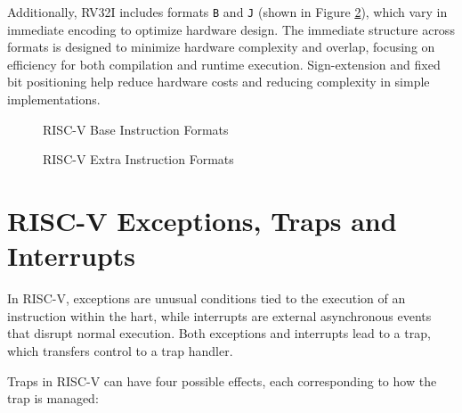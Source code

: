 Additionally, RV32I includes formats \texttt{B} and \texttt{J} (shown in Figure \ref{fig:extrainstrformats}),
which vary in immediate encoding to optimize hardware design. The immediate
structure across formats is designed to minimize hardware complexity and overlap,
focusing on efficiency for both compilation and runtime execution. Sign-extension
and fixed bit positioning help reduce hardware costs and reducing complexity in
simple implementations.

\begin{figure}[htbp]
  \centering
  \def\stackalignment{r}
  {\scriptsize }
  \caption{RISC-V Base Instruction Formats}
  \label{fig:instrformats}
\end{figure}

\begin{figure}[htbp]
  \centering
  \def\stackalignment{r} %
  {\scriptsize }
  \caption{RISC-V Extra Instruction Formats}
  \label{fig:extrainstrformats}
\end{figure}

\section{RISC-V Exceptions, Traps and Interrupts}
\label{sec:riscv_eti}

In RISC-V, exceptions are unusual conditions tied to the execution of an
instruction within the hart, while interrupts are external asynchronous events that
disrupt normal execution. Both exceptions and interrupts lead to a trap, which transfers
control to a trap handler.

Traps in RISC-V can have four possible effects, each corresponding to how the
trap is managed:

